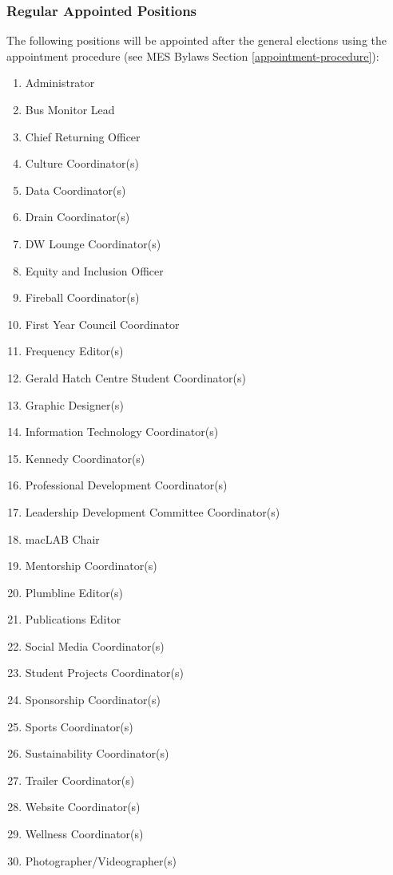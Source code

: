\subsubsection{Regular Appointed Positions}
\label{regular-appointed-positions}
The following positions will be appointed after the general elections
using the appointment procedure (see MES Bylaws Section \ref{appointment-procedure}): %

\begin{enumerate}
 \item
  Administrator
 \item
  Bus Monitor Lead
 \item
  Chief Returning Officer
 \item
  Culture Coordinator(s)
 \item
  Data Coordinator(s)
 \item
  Drain Coordinator(s)
 \item
  DW Lounge Coordinator(s)
 \item
  Equity and Inclusion Officer
 \item
  Fireball Coordinator(s)
 \item
  First Year Council Coordinator
 \item
  Frequency Editor(s)
 \item
  Gerald Hatch Centre Student Coordinator(s)
 \item
  Graphic Designer(s)
 \item
  Information Technology Coordinator(s)
 \item
  Kennedy Coordinator(s)
 \item
  Professional Development Coordinator(s)
 \item
  Leadership Development Committee Coordinator(s)
 \item
  macLAB Chair
 \item
  Mentorship Coordinator(s)
 \item
  Plumbline Editor(s)
 \item
  Publications Editor
 \item
  Social Media Coordinator(s)
 \item
  Student Projects Coordinator(s)
 \item
  Sponsorship Coordinator(s)
 \item
  Sports Coordinator(s)
 \item
  Sustainability Coordinator(s)
 \item
  Trailer Coordinator(s)
 \item
  Website Coordinator(s)
 \item
  Wellness Coordinator(s)
 \item
  Photographer/Videographer(s)
\end{enumerate}

